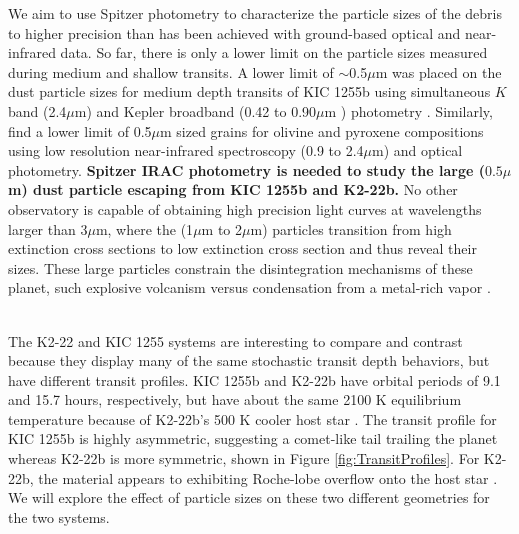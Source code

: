\documentclass[letterpaper,12pt]{article}
\begin{document}
We aim to use Spitzer photometry to characterize the particle sizes of the debris to higher precision than has been achieved with ground-based optical and near-infrared data.
So far, there is only a lower limit on the particle sizes measured during medium and shallow transits.
A lower limit of $\sim$0.5$\mu$m was placed on the dust particle sizes for medium depth transits of KIC 1255b using simultaneous $K$ band (2.4$\mu$m) and Kepler broadband (0.42 to 0.90$\mu$m ) photometry \citep{croll2014}.
Similarly, \citet{schlawin2016kic1255} find a lower limit of 0.5$\mu$m sized grains for olivine and pyroxene compositions using low resolution near-infrared spectroscopy (0.9 to 2.4$\mu$m) and optical photometry.
\textbf{Spitzer IRAC photometry is needed to study the large ($0.5\mu$m) dust particle escaping from KIC 1255b and K2-22b.}
No other observatory is capable of obtaining high precision light curves at wavelengths larger than 3$\mu$m, where the (1$\mu$m to 2$\mu$m) particles transition from high extinction cross sections to low extinction cross section and thus reveal their sizes.
These large particles constrain the disintegration mechanisms of these planet, such explosive volcanism versus condensation from a metal-rich vapor \citep{rappaport}.\newline

%

\\
The K2-22 and KIC 1255 systems are interesting to compare and contrast because they display many of the same stochastic transit depth behaviors, but have different transit profiles.
KIC 1255b and K2-22b have orbital periods of 9.1 and 15.7 hours, respectively, but have about the same 2100 K equilibrium temperature because of K2-22b's  500 K cooler host star \citep{sanchis-ojedak2-22}.
The transit profile for KIC 1255b is highly asymmetric, suggesting a comet-like tail trailing the planet whereas K2-22b is more symmetric, shown in Figure \ref{fig:TransitProfiles}.
For K2-22b, the material appears to exhibiting Roche-lobe overflow onto the host star \cite{sanchis-ojedak2-22}.
We will explore the effect of particle sizes on these two different geometries for the two systems.
\newline
\end{document}
